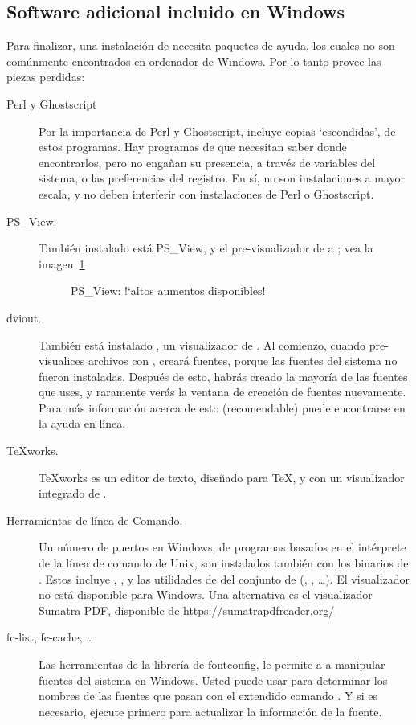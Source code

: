\documentclass{article}
\begin{document}
\subsection{Software adicional incluido en Windows}
Para finalizar, una instalación de \TL{} necesita paquetes de ayuda, los cuales no
son comúnmente encontrados en ordenador de Windows. Por lo tanto \TL{} provee las
piezas perdidas:
\begin{description}
	\item[Perl y Ghostscript] Por la importancia de Perl y Ghostscript, \TL{}
		incluye copias `escondidas', de estos programas. Hay programas de
		\TL{} que necesitan saber donde encontrarlos, pero no engañan su
		presencia, a través de variables del
		sistema, o las preferencias
		del registro. En sí, no son instalaciones a mayor escala, y no
		deben interferir con instalaciones de Perl o Ghostscript. 

	\item[PS\_View.] También instalado está PS\_View, y el
		pre-visualizador de \PS{} a ; vea la
		imagen~\ref{fig:psview}

\begin{figure}[tb]
\caption{PS\_View: !`altos aumentos disponibles!}\label{fig:psview}
\end{figure}

\item[dviout.] También está instalado , un visualizador de
	. Al comienzo, cuando pre-visualices archivos con
	, creará fuentes, porque las fuentes del sistema
	no fueron instaladas. Después de esto, habrás creado la mayoría de
	las fuentes que uses, y raramente verás la ventana de creación de
	fuentes nuevamente. Para más información acerca de esto
	(recomendable) puede encontrarse en la ayuda en línea. 

\item[\TeX{}works.] \TeX{}works es un editor de texto, diseñado para
	\TeX{}, y con un visualizador integrado de .

\item[Herramientas de línea de Comando.] Un número de puertos en Windows, de
	programas basados en el intérprete de la línea de comando de Unix, son
		instalados también con los binarios de \TL{}. Estos incluye
		, , y las utilidades de del
		conjunto de  (,
		, \ldots).  El visualizador  no
		está disponible para Windows.  Una alternativa es el
		visualizador Sumatra PDF, disponible de
		\url{https://sumatrapdfreader.org/} 	

\item[fc-list, fc-cache, \ldots] Las herramientas de la librería de
	fontconfig, le permite a \XeTeX{} a manipular fuentes del sistema
	en Windows. Usted puede usar  para determinar los
	nombres de las fuentes que pasan con el extendido comando
	. Y si es necesario, ejecute  primero para
	actualizar la información de la fuente.

\end{description}
\end{document}
